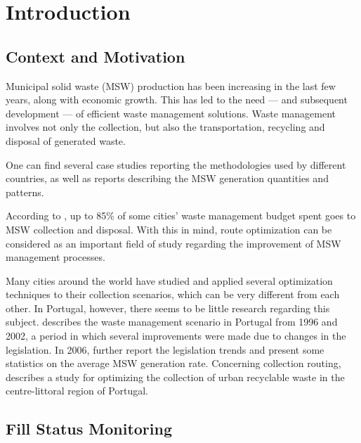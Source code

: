 \chapter{Introduction} \label{chap:intro}

\section*{}


\section{Context and Motivation}
\label{section:context}

Municipal solid waste (MSW) production has been increasing in the last few
years, along with economic growth\citep{McCarthy94}. This has led to the need
--- and subsequent development --- of efficient waste management solutions.
Waste management involves not only the collection, but also the transportation,
recycling and disposal of generated waste.

One can find several case studies reporting the methodologies used by different
countries, as well as reports describing the MSW generation quantities and
patterns.

According to \citet{Bhat1996}, up to 85\% of some cities' waste management
budget spent goes to MSW collection and disposal. With this in mind, route
optimization can be considered as an important field of study regarding the
improvement of MSW management processes.

Many cities around the world have studied and applied several optimization
techniques to their collection scenarios, which can be very different from each
other. In Portugal, however, there seems to be little research regarding this
subject. \citet{Passaro200397} describes the waste management scenario in
Portugal from 1996 and 2002, a period in which several improvements were made
due to changes in the legislation. In 2006, \citet{Magrinho20061477} further
report the legislation trends and present some statistics on the average MSW
generation rate. Concerning collection routing, \citet{Teixeira04} describes a
study for optimizing the collection of urban recyclable waste in the
centre-littoral region of Portugal.




\section{Fill Status Monitoring}
\label{section:monitoring}

